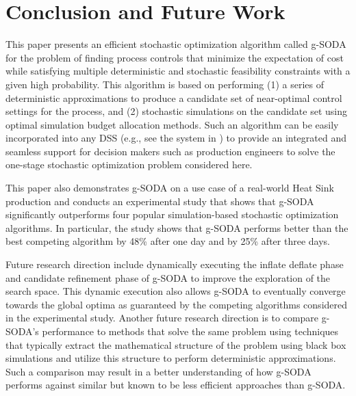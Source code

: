\documentclass[a4paper, 12pt]{article} %
\begin{document}
\section{Conclusion and Future Work}
\label{sec:conclusion}

This paper presents an efficient stochastic optimization algorithm called g-SODA for the problem of finding process controls that minimize the expectation of cost while satisfying multiple deterministic and stochastic feasibility constraints with a given high probability. 
This algorithm is based on performing (1) a series of deterministic approximations to produce a candidate set of near-optimal control settings for the process, and (2) stochastic simulations on the candidate set using optimal simulation budget allocation methods.  
Such an algorithm can be easily incorporated into any DSS (e.g., see the system in \cite{Brodsky2017ieeebd}) to provide an integrated and seamless support for decision makers such as production engineers to solve the one-stage stochastic optimization problem considered here.

This paper also demonstrates g-SODA on a use case of a real-world Heat Sink production and  conducts an experimental study that shows that g-SODA significantly outperforms four popular simulation-based stochastic optimization algorithms. In particular, the study shows that g-SODA performs better than the best competing algorithm by 48\% after one day and by 25\% after three days.

Future research direction include dynamically executing the inflate deflate phase and candidate refinement phase of g-SODA to improve the exploration of the search space. This dynamic execution also allows g-SODA to eventually converge towards the global optima as guaranteed by the competing algorithms considered in the experimental study. Another future research direction is to compare g-SODA's performance to methods that solve the same problem using techniques that typically extract the mathematical structure of the problem using black box simulations and utilize this structure to perform deterministic approximations. Such a comparison may result in a better understanding of how g-SODA performs against similar but known to be less efficient approaches than g-SODA. 

\end{document}
